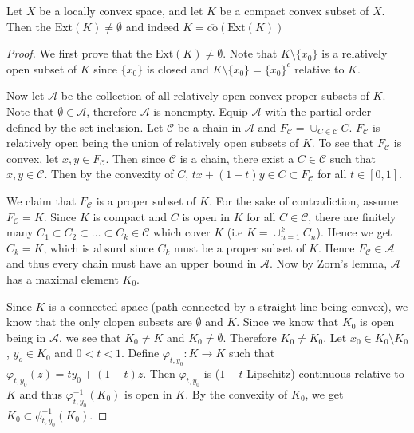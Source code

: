 \begin{theorem}
  Let $X$ be a locally convex space, and let $K$ be a compact convex
  subset of $X$. Then the $ \textrm{Ext}(K) \neq \emptyset$ and
  indeed $K = \overline{\textrm{co}}(\textrm{Ext}(K))$
\end{theorem}
\begin{proof}
  We first prove that the $\textrm{Ext}(K) \neq \emptyset$.
  Note that $K \setminus \{ x_0 \}$ is a
  relatively open subset of $K$ since $\{ x_0 \}$ is closed and $K
  \setminus \{ x_0 \} = \{ x_0 \}^c$ relative to $K$.

  Now let $ \mathcal{A}$ be the collection of all relatively open
  convex proper subsets of $K$. Note that $\emptyset \in
  \mathcal{A}$, therefore $\mathcal{A}$ is nonempty. Equip
  $\mathcal{A}$ with the partial order defined by the set inclusion.
  Let $\mathscr{C}$ be a chain in $\mathcal{A}$ and $F_{\mathscr{C}}
  = \cup_{C \in \mathscr{C}} C$. $F_{ \mathscr{C}}$ is relatively
  open being the union of relatively open subsets of $K$. To see that
  $F_{\mathscr{C}}$ is convex, let $x,  y \in F_{\mathscr{C}}$. Then
  since $\mathscr{C}$ is a chain, there exist a $C \in \mathscr{C}$
  such that $x, y \in \mathscr{C}$. Then by the convexity of $C$, $tx + (1-t)y \in C
  \subset F_{\mathscr{C}}$ for all $t \in [0, 1]$.

  We claim that $F_{ \mathscr{C}}$ is a proper subset of $K$. For the
  sake of contradiction, assume $F_{ \mathscr{C}} = K$. Since $K$ is
  compact and $C$ is open in $K$ for all $C \in \mathscr{C}$, there
  are finitely many $C_1 \subset C_2 \subset \ldots \subset C_k \in
  \mathscr{C}$ which cover $K$ (i.e $K = \cup_{n = 1}^{k}C_n$). Hence
  we get $C_k = K$, which is absurd since $C_k$ must be a proper subset of $K$.
  Hence $F_{\mathscr{C}} \in \mathcal{A}$ and thus every chain must
  have an upper bound in $\mathcal{A}$. Now by Zorn's lemma,
  $\mathcal{A}$ has a maximal element $K_0$.

  Since $K$ is a connected space (path connected by a straight line being convex), we know that the only
  clopen subsets are $\emptyset$ and $K$. Since we know that $K_0$ is
  open being in $\mathcal{A}$, we see that $K_0 \neq K$ and $K_0 \neq
  \emptyset$. Therefore $\overline{K_0} \neq K_0$. Let $x_0 \in
  \overline{K_0} \setminus K_0$, $y_o \in K_0$ and $0 < t <1$. Define
  $\varphi_{t, y_0}: K \to K$ such that $\varphi_{t, y_0}(z) = ty_0 +
  (1-t) z$. Then $\varphi_{t, y_0}$ is ($1-t$ Lipschitz) continuous
  relative to $K$ and thus $\varphi_{t, y_0}^{-1}(K_0)$ is open in
  $K$.
  By the convexity of $K_0$, we get $K_0 \subset \phi^{-1}_{t, y_0}(K_0)$.


\end{proof}
